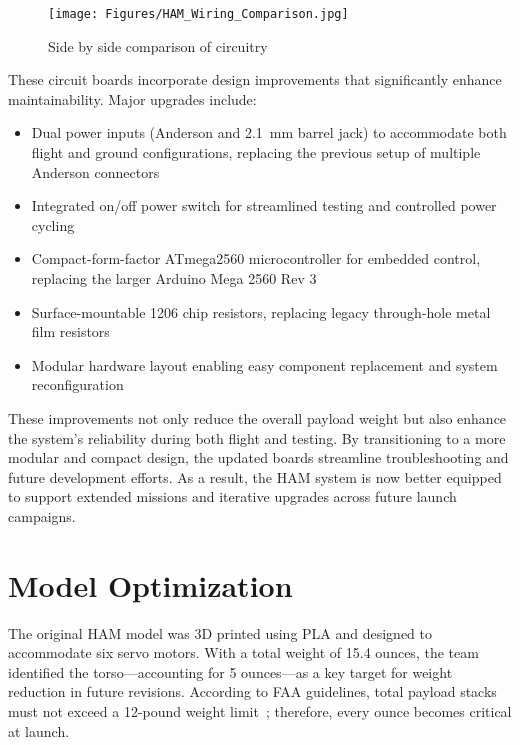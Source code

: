 \begin{figure}[H]
    \centering
    \texttt{[image: Figures/HAM\_Wiring\_Comparison.jpg]}
    \caption{Side by side comparison of circuitry}
    \label{Fig:Wiring_SideBySide}
\end{figure}
\vspace{-2em}

These circuit boards incorporate design improvements that significantly enhance maintainability. Major upgrades include:

\vspace{-2em}
\begin{itemize}
    \item Dual power inputs (Anderson and 2.1~mm barrel jack) to accommodate both flight and ground configurations, replacing the previous setup of multiple Anderson connectors
    \item Integrated on/off power switch for streamlined testing and controlled power cycling
    \item Compact-form-factor ATmega2560 microcontroller for embedded control, replacing the larger Arduino Mega 2560 Rev 3
    \item Surface-mountable 1206 chip resistors, replacing legacy through-hole metal film resistors
    \item Modular hardware layout enabling easy component replacement and system reconfiguration
\end{itemize}

These improvements not only reduce the overall payload weight but also enhance the system’s reliability during both flight and testing. By transitioning to a more modular and compact design, the updated boards streamline troubleshooting and future development efforts. As a result, the HAM system is now better equipped to support extended missions and iterative upgrades across future launch campaigns.

\vspace{-2em}  %
\section{Model Optimization}
\vspace{-2em}  %

The original HAM model was 3D printed using PLA and designed to accommodate six servo motors. With a total weight of 15.4 ounces, the team identified the torso—accounting for 5 ounces—as a key target for weight reduction in future revisions. According to FAA guidelines, total payload stacks must not exceed a 12-pound weight limit~\cite{CFR_Part_101}; therefore, every ounce becomes critical at launch.

